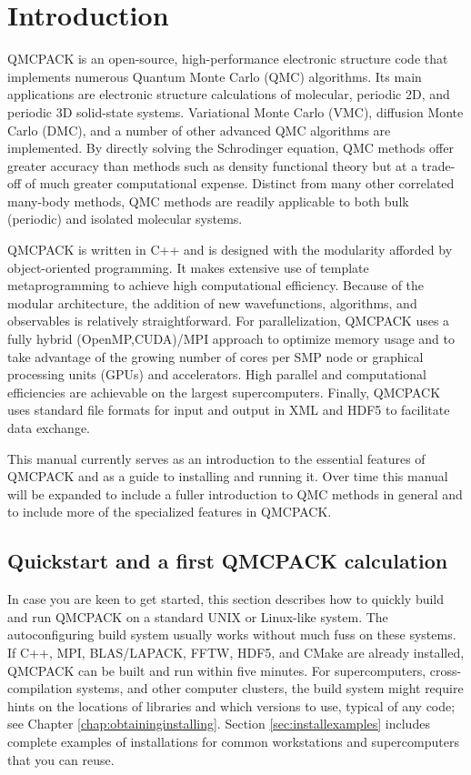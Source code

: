 \chapter{Introduction}
\label{chap:introduction}

QMCPACK is an open-source, high-performance electronic structure code
that implements numerous Quantum Monte Carlo (QMC) algorithms. Its main
applications are electronic structure calculations of molecular,
periodic 2D, and periodic 3D solid-state systems. Variational Monte
Carlo (VMC), diffusion Monte Carlo (DMC), and a number of other
advanced QMC algorithms are implemented. By directly solving the
Schrodinger equation, QMC methods offer greater accuracy than methods
such as density functional theory but at a trade-off of much greater
computational expense. Distinct from many other correlated many-body
methods, QMC methods are readily applicable to both bulk
(periodic) and isolated molecular systems.

QMCPACK is written in C++ and is designed with the modularity afforded by
object-oriented programming. It makes extensive use of template
metaprogramming to achieve high computational efficiency. Because of the
modular architecture, the addition of new wavefunctions, algorithms,
and observables is relatively straightforward. For parallelization,
QMCPACK uses a fully hybrid (OpenMP,CUDA)/MPI approach to optimize
memory usage and to take advantage of the growing number of cores per
SMP node or graphical processing units (GPUs) and accelerators. High
parallel and computational efficiencies are achievable on the largest
supercomputers. Finally, QMCPACK uses standard file formats for
input and output in XML and HDF5 to facilitate data exchange.

This manual currently serves as an introduction to the essential features
of QMCPACK and as a guide to installing and running it. Over time this
manual will be expanded to include a fuller introduction to QMC
methods in general and to include more of the specialized features in
QMCPACK.

\section{Quickstart and a first QMCPACK calculation}
In case you are keen to get started, this section describes how to quickly
build and run QMCPACK on a standard UNIX or Linux-like system. The
autoconfiguring build system usually works without much fuss on these
systems.  If C++, MPI, BLAS/LAPACK, FFTW, HDF5, and CMake are already
installed, QMCPACK can be built and run within five minutes. For
supercomputers, cross-compilation systems, and other computer clusters,
the build system might require hints on the locations of libraries and
which versions to use, typical of any code; see Chapter
\ref{chap:obtaininginstalling}. Section \ref{sec:installexamples}
includes complete examples of installations for common workstations and supercomputers that you can reuse.

